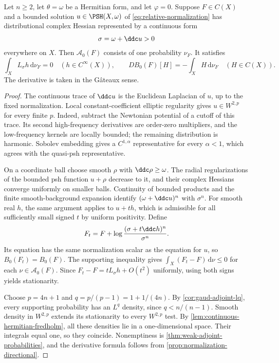 \begin{theorem}\label{thm:continuous-hessian-adjoint-uniqueness}
Let $n\geq2$, let $\theta=\omega$ be a Hermitian form, and let $\varphi=0$.
Suppose $F\in C(X)$ and a bounded solution $u\in\PSH(X,\omega)$ of
\eqref{eq:relative-normalization} has distributional complex Hessian
represented by a continuous form
\[
 \sigma=\omega+\ddc u>0
\]
everywhere on $X$. Then $\mathcal A_0(F)$ consists of one probability
$\nu_F$. It satisfies
\[
 \int_X L_\sigma h\,\mathrm d\nu_F=0\quad(h\in C^\infty(X)),
 \qquad
 DB_0(F)[H]=-\int_XH\,\mathrm d\nu_F\quad(H\in C(X)).
\]
The derivative is taken in the G\^ateaux sense.
\end{theorem}
\begin{proof}
The continuous trace of $\ddc u$ is the Euclidean Laplacian of $u$, up
to the fixed normalization. Local constant-coefficient elliptic
regularity gives $u\in W^{2,p}$ for every finite $p$. Indeed, subtract
the Newtonian potential of a cutoff of this trace. Its second
high-frequency derivatives are order-zero multipliers, and the
low-frequency kernels are locally bounded; the remaining distribution
is harmonic. Sobolev embedding gives a $C^{1,\alpha}$ representative
for every $\alpha<1$, which agrees with the quasi-psh representative.

On a coordinate ball choose smooth $\rho$ with $\ddc\rho\geq\omega$.
The radial regularizations of the bounded psh function $u+\rho$ decrease
to it, and their complex Hessians converge uniformly on smaller balls.
Continuity of bounded products and the finite smooth-background
expansion identify $(\omega+\ddc u)^n$ with $\sigma^n$. For smooth real
$h$, the same argument applies to $u+th$, which is admissible for all
sufficiently small signed $t$ by uniform positivity. Define
\[
 F_t=F+\log\frac{(\sigma+t\ddc h)^n}{\sigma^n}.
\]
Its equation has the same normalization scalar as the equation for $u$,
so $B_0(F_t)=B_0(F)$. The supporting inequality gives
$\int_X(F_t-F)\,\mathrm d\nu\leq0$ for each
$\nu\in\mathcal A_0(F)$. Since
$F_t-F=tL_\sigma h+O(t^2)$ uniformly, using both signs yields stationarity.

Choose $p=4n+1$ and $q=p/(p-1)=1+1/(4n)$. By
\cref{cor:gaud-adjoint-lq}, every supporting probability has an $L^q$
density, since $q<n/(n-1)$. Smooth density in $W^{2,p}$ extends its
stationarity to every $W^{2,p}$ test. By
\cref{lem:continuous-hermitian-fredholm}, all these densities lie in a
one-dimensional space. Their integrals equal one, so they coincide.
Nonemptiness is \cref{thm:weak-adjoint-probabilities}, and the derivative
formula follows from \cref{prop:normalization-directional}.
\end{proof}


